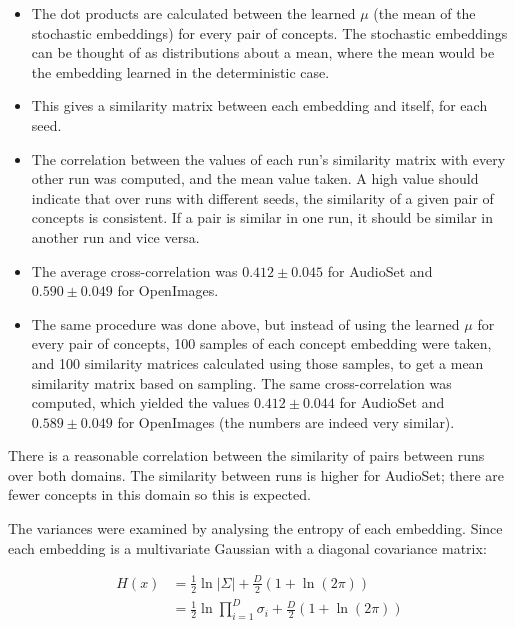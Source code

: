 \begin{itemize}
    \item The dot products are calculated between the learned $\mu$ (the mean of the stochastic embeddings) for every pair of concepts. The stochastic embeddings can be thought of as distributions about a mean, where the mean would be the embedding learned in the deterministic case. 
    \item This gives a similarity matrix between each embedding and itself, for each seed. 
    \item The correlation between the values of each run's similarity matrix with every other run was computed, and the mean value taken. A high value should indicate that over runs with different seeds, the similarity of a given pair of concepts is consistent. If a pair is similar in one run, it should be similar in another run and vice versa. 
    \item The average cross-correlation was $ 0.412 \pm 0.045$ for AudioSet and $0.590 \pm 0.049$ for OpenImages. 
    \item The same procedure was done above, but instead of using the learned $\mu$ for every pair of concepts, 100 samples of each concept embedding were taken, and 100 similarity matrices calculated using those samples, to get a mean similarity matrix based on sampling. The same cross-correlation was computed, which yielded the values $ 0.412 \pm 0.044$ for AudioSet and $0.589 \pm 0.049$ for OpenImages (the numbers are indeed very similar). 
\end{itemize}

There is a reasonable correlation between the similarity of pairs between runs over both domains. The similarity between runs is higher for AudioSet; there are fewer concepts in this domain so this is expected. 

The variances were examined by analysing the entropy of each embedding. Since each embedding is a multivariate Gaussian with a diagonal covariance matrix:

\begin{equation*}
\begin{split}
H(x) &= \frac{1}{2} \ln |\Sigma| + \frac{D}{2}(1 + \ln(2 \pi))\\
&= \frac{1}{2} \ln \prod_{i=1}^D \sigma_i + \frac{D}{2}(1 + \ln(2 \pi))\\
\end{split}
\end{equation*}

